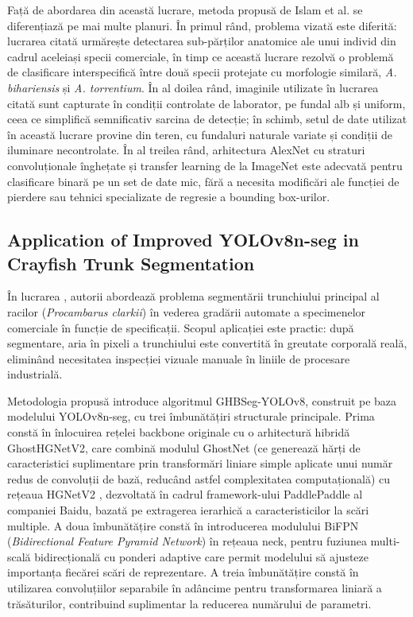 Față de abordarea din această lucrare, metoda propusă de Islam et al. \cite{Identification_Algorithm_of_Crayfish_Body_Features_Based_on_the_Improved_YOLOv8n_Loss_Function} se diferențiază pe mai multe planuri. În primul rând, problema vizată este diferită: lucrarea citată urmărește detectarea sub-părților anatomice ale unui individ din cadrul aceleiași specii comerciale, în timp ce această lucrare rezolvă o problemă de clasificare interspecifică între două specii protejate cu morfologie similară, \textit{A. bihariensis} și \textit{A. torrentium}. În al doilea rând, imaginile utilizate în lucrarea citată sunt capturate în condiții controlate de laborator, pe fundal alb și uniform, ceea ce simplifică semnificativ sarcina de detecție; în schimb, setul de date utilizat în această lucrare provine din teren, cu fundaluri naturale variate și condiții de iluminare necontrolate. În al treilea rând, arhitectura AlexNet cu straturi convoluționale înghețate și transfer learning de la ImageNet este adecvată pentru clasificare binară pe un set de date mic, fără a necesita modificări ale funcției de pierdere sau tehnici specializate de regresie a bounding box-urilor.



\subsection{Application of Improved YOLOv8n-seg in Crayfish Trunk Segmentation}

În lucrarea \cite{Application_of_Improved_YOLOv8n-seg_in_Crayfish_Trunk_Segmentation}, autorii abordează problema segmentării trunchiului principal al racilor (\textit{Procambarus clarkii}) în vederea gradării automate a specimenelor comerciale în funcție de specificații. Scopul aplicației este practic: după segmentare, aria în pixeli a trunchiului este convertită în greutate corporală reală, eliminând necesitatea inspecției vizuale manuale în liniile de procesare industrială.


Metodologia propusă introduce algoritmul GHBSeg-YOLOv8, construit pe baza modelului YOLOv8n-seg, cu trei îmbunătățiri structurale principale. Prima constă în înlocuirea rețelei backbone originale cu o arhitectură hibridă GhostHGNetV2, care combină modulul GhostNet \cite{han2020ghostnet} (ce generează hărți de caracteristici suplimentare prin transformări liniare simple aplicate unui număr redus de convoluții de bază, reducând astfel complexitatea computațională) cu rețeaua HGNetV2 \cite{pphgnetv2}, dezvoltată în cadrul framework-ului PaddlePaddle al companiei Baidu, bazată pe extragerea ierarhică a caracteristicilor la scări multiple. A doua îmbunătățire constă în introducerea modulului BiFPN (\textit{Bidirectional Feature Pyramid Network}) \cite{tan2020efficientdet} în rețeaua neck, pentru fuziunea multi-scală bidirecțională cu ponderi adaptive care permit modelului să ajusteze importanța fiecărei scări de reprezentare. A treia îmbunătățire constă în utilizarea convoluțiilor separabile în adâncime pentru transformarea liniară a trăsăturilor, contribuind suplimentar la reducerea numărului de parametri.


